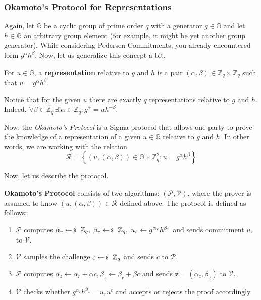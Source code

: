 \documentclass[../../book.tex]{subfiles}
\begin{document}
\subsubsection{Okamoto's Protocol for Representations}\label{section:okamoto_protocol}

Again, let $\mathbb{G}$ be a cyclic group of prime order $q$ with a generator $g \in \mathbb{G}$ and let $h \in \mathbb{G}$ an arbitrary group element (for example, it might be yet another group generator). While considering Pedersen Commitments, you already encountered form $g^{\alpha}h^{\beta}$. Now, let us generalize this concept a bit.

\begin{definition}
    For $u \in \mathbb{G}$, a \textbf{representation} relative to $g$ and $h$ is a pair $(\alpha,\beta) \in \mathbb{Z}_q \times \mathbb{Z}_q$ such that $u=g^{\alpha}h^{\beta}$.
\end{definition}

\begin{remark}
    Notice that for the given $u$ there are exactly $q$ representations relative to $g$ and $h$. Indeed, $\forall \beta \in \mathbb{Z}_q \, \exists! \alpha \in \mathbb{Z}_q: g^{\alpha} = uh^{-\beta}$. 
\end{remark}

Now, the \textit{Okamoto's Protocol} is a Sigma protocol that allows one party to prove the knowledge of a representation of a given $u \in \mathbb{G}$ relative to $g$ and $h$. In other words, we are working with the relation
\begin{equation*}
    \mathcal{R} = \left\{ (u,(\alpha,\beta)) \in \mathbb{G} \times \mathbb{Z}_q^2: u = g^{\alpha}h^{\beta} \right\}
\end{equation*}

Now, let us describe the protocol.

\begin{definition}
    \textbf{Okamoto's Protocol} consists of two algorithms: $(\mathcal{P}, \mathcal{V})$, where the prover is assumed to know $(u,(\alpha,\beta)) \in \mathcal{R}$ defined above. The protocol is defined as follows:
    \begin{enumerate}
        \item $\mathcal{P}$ computes $\alpha_r \leftarrowS \mathbb{Z}_q, \; \beta_r \leftarrowS \mathbb{Z}_q, \; u_r \gets g^{\alpha_r}h^{\beta_r}$ and sends commitment $u_r$ to $\mathcal{V}$.
        \item $\mathcal{V}$ samples the challenge $c \leftarrowS \mathbb{Z}_q$ and sends $c$ to $\mathcal{P}$.
        \item $\mathcal{P}$ computes $\alpha_z \gets \alpha_r + \alpha c, \beta_z \gets \beta_r + \beta c$ and sends $\mathbf{z} = (\alpha_z,\beta_z)$ to $\mathcal{V}$.
        \item $\mathcal{V}$ checks whether $g^{\alpha_z}h^{\beta_z} = u_r u^c$ and accepts or rejects the proof accordingly.
    \end{enumerate}
\end{definition}
\end{document}
